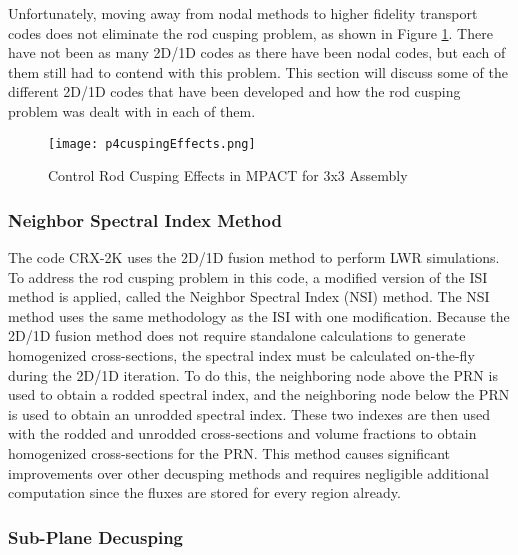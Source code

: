 Unfortunately, moving away from nodal methods to higher fidelity transport codes does not eliminate the rod cusping problem, as shown in Figure \ref{f:p4cuspingEffects}.  There have not been as many 2D/1D codes as there have been nodal codes, but each of them still had to contend with this problem.  This section will discuss some of the different 2D/1D codes that have been developed and how the rod cusping problem was dealt with in each of them.

\begin{figure}[h]
    \centering
    \texttt{[image: p4cuspingEffects.png]}
    \caption[Rod Cusping in MPACT]{Control Rod Cusping Effects in MPACT for 3x3 Assembly}\label{f:p4cuspingEffects}
\end{figure}

\subsubsection{Neighbor Spectral Index Method}

The code CRX-2K \cite{cho2015CRX2d1dFusionDecusping} uses the 2D/1D fusion method to perform LWR simulations.  To address the rod cusping problem in this code, a modified version of the ISI method is applied, called the Neighbor Spectral Index (NSI) method.  The NSI method uses the same methodology as the ISI with one modification.  Because the 2D/1D fusion method does not require standalone calculations to generate homogenized cross-sections, the spectral index must be calculated on-the-fly during the 2D/1D iteration.  To do this, the neighboring node above the PRN is used to obtain a rodded spectral index, and the neighboring node below the PRN is used to obtain an unrodded spectral index.  These two indexes are then used with the rodded and unrodded cross-sections and volume fractions to obtain homogenized cross-sections for the PRN.  This method causes significant improvements over other decusping methods and requires negligible additional computation since the fluxes are stored for every region already.

\subsubsection{Sub-Plane Decusping}\label{sss:ntracerDecusping}


